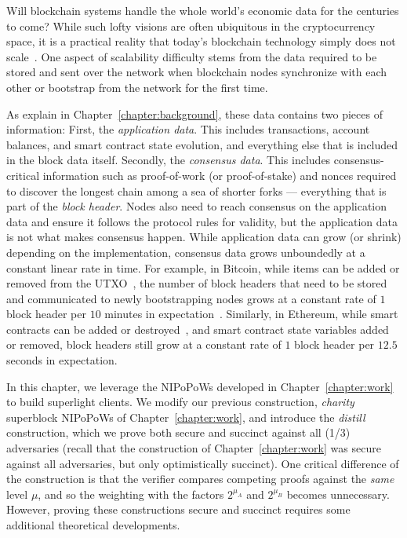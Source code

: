 Will blockchain systems handle the whole world's economic data
for the centuries to come? While such lofty visions are often
ubiquitous in the cryptocurrency space, it is a practical reality
that today's blockchain technology simply does not scale~\cite{divide-and-scale}.
One aspect of scalability difficulty stems from the data
required to be stored and sent over the network when blockchain
nodes synchronize with each other or bootstrap from the network
for the first time.

As explain in Chapter~\ref{chapter:background},
these data contains two pieces of information: First,
the \emph{application data}. This includes transactions, account
balances, and smart contract state evolution, and everything else
that is included in the block data itself. Secondly, the
\emph{consensus data}. This includes consensus-critical information
such as proof-of-work (or proof-of-stake) and nonces required to discover
the longest chain among a sea of shorter forks --- everything that
is part of the \emph{block header}. Nodes also need
to reach consensus on the application data and ensure it follows the
protocol rules for validity, but the application
data is not what makes consensus happen. While application data can
grow (or shrink) depending on the implementation,
consensus data grows unboundedly at a
constant linear rate in time. For example, in Bitcoin, while items can be
added or removed from the UTXO~\cite{sok}, the number of block headers that
need to be stored and communicated to newly bootstrapping nodes grows
at a constant rate of $1$ block header per $10$ minutes in expectation~\cite{bitcoin-dev-guide}.
Similarly,
in Ethereum, while smart contracts can be added or destroyed~\cite{eip6},
and smart contract state variables added or removed, block headers
still grow at a constant rate of $1$ block header per $12.5$ seconds
in expectation.

In this chapter, we leverage the NIPoPoWs developed in Chapter~\ref{chapter:work}
to build superlight clients. We modify our previous construction, \emph{charity}
superblock NIPoPoWs of Chapter~\ref{chapter:work}, and introduce the
\emph{distill} construction, which we prove both secure and succinct
against all (1/3) adversaries (recall that the construction of Chapter~\ref{chapter:work}
was secure against all adversaries, but only optimistically succinct).
One critical difference of the construction is that the verifier compares
competing proofs against the \emph{same} level $\mu$, and so the weighting
with the factors $2^{\mu_A}$ and $2^{\mu_B}$ becomes unnecessary. However,
proving these constructions secure and succinct requires some additional
theoretical developments.

